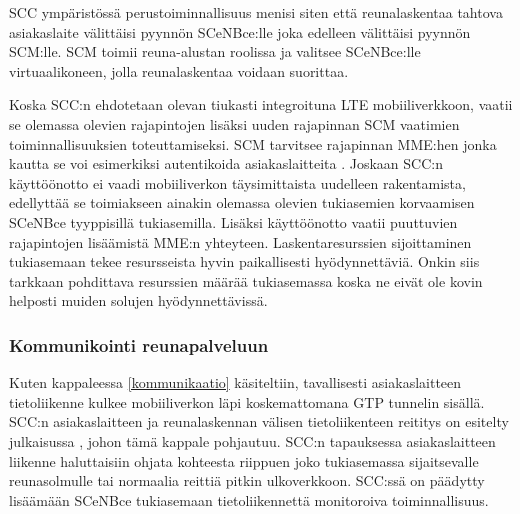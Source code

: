 SCC ympäristössä perustoiminnallisuus menisi siten että reunalaskentaa tahtova asiakaslaite välittäisi pyynnön SCeNBce:lle joka edelleen välittäisi pyynnön SCM:lle.
SCM toimii reuna-alustan roolissa ja valitsee SCeNBce:lle virtuaalikoneen, jolla reunalaskentaa voidaan suorittaa. \cite{dolezal2016performance}


Koska SCC:n ehdotetaan olevan tiukasti integroituna LTE mobiiliverkkoon, vaatii se olemassa olevien rajapintojen lisäksi uuden rajapinnan SCM vaatimien toiminnallisuuksien toteuttamiseksi. SCM tarvitsee rajapinnan MME:hen jonka kautta se voi esimerkiksi autentikoida asiakaslaitteita \cite{lobillo15scc}. 
Joskaan SCC:n käyttöönotto ei vaadi mobiiliverkon täysimittaista uudelleen rakentamista, edellyttää se toimiakseen ainakin olemassa olevien tukiasemien korvaamisen SCeNBce tyyppisillä tukiasemilla. Lisäksi käyttöönotto vaatii puuttuvien rajapintojen lisäämistä MME:n yhteyteen. 
Laskentaresurssien sijoittaminen tukiasemaan tekee resursseista hyvin paikallisesti hyödynnettäviä. Onkin siis tarkkaan pohdittava resurssien määrää tukiasemassa koska ne eivät ole kovin helposti muiden solujen hyödynnettävissä.

 
%

\subsubsection{Kommunikointi reunapalveluun} \label{GTP}
Kuten kappaleessa \ref{kommunikaatio} käsiteltiin, tavallisesti asiakaslaitteen tietoliikenne kulkee mobiiliverkon läpi koskemattomana GTP tunnelin sisällä. 
SCC:n asiakaslaitteen ja reunalaskennan välisen tietoliikenteen reititys on esitelty julkaisussa \cite{puente15seamless}, johon tämä kappale pohjautuu.
SCC:n tapauksessa asiakaslaitteen liikenne haluttaisiin ohjata kohteesta riippuen joko tukiasemassa sijaitsevalle reunasolmulle tai normaalia reittiä pitkin ulkoverkkoon.
SCC:ssä on päädytty lisäämään SCeNBce tukiasemaan tietoliikennettä monitoroiva toiminnallisuus.

